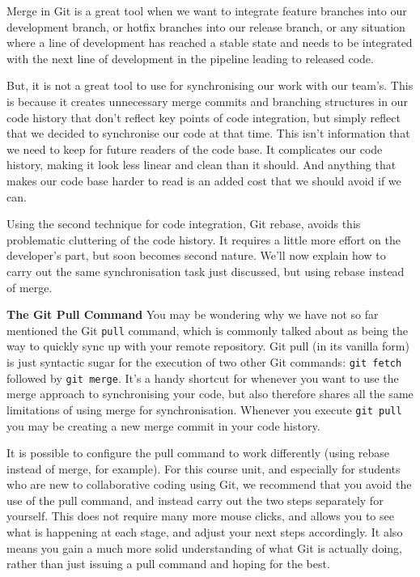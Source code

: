 \documentclass[
]{book}
\begin{document}
Merge in Git is a great tool when we want to integrate feature branches into our development branch, or hotfix branches into our release branch, or any situation where a line of development has reached a stable state and needs to be integrated with the next line of development in the pipeline leading to released code.

But, it is not a great tool to use for synchronising our work with our team's. This is because it creates unnecessary merge commits and branching structures in our code history that don't reflect key points of code integration, but simply reflect that we decided to synchronise our code at that time. This isn't information that we need to keep for future readers of the code base. It complicates our code history, making it look less linear and clean than it should. And anything that makes our code base harder to read is an added cost that we should avoid if we can.

Using the second technique for code integration, Git rebase, avoids this problematic cluttering of the code history. It requires a little more effort on the developer's part, but soon becomes second nature. We'll now explain how to carry out the same synchronisation task just discussed, but using rebase instead of merge.

\textbf{The Git Pull Command}
You may be wondering why we have not so far mentioned the Git \texttt{pull} command, which is commonly talked about as being the way to quickly sync up with your remote repository.
Git pull (in its vanilla form) is just syntactic sugar for the execution of two other Git commands: \texttt{git\ fetch} followed by \texttt{git\ merge}. It's a handy shortcut for whenever you want to use the merge approach to synchronising your code, but also therefore shares all the same limitations of using merge for synchronisation. Whenever you execute \texttt{git\ pull} you may be creating a new merge commit in your code history.

It is possible to configure the pull command to work differently (using rebase instead of merge, for example). For this course unit, and especially for students who are new to collaborative coding using Git, we recommend that you avoid the use of the pull command, and instead carry out the two steps separately for yourself. This does not require many more mouse clicks, and allows you to see what is happening at each stage, and adjust your next steps accordingly. It also means you gain a much more solid understanding of what Git is actually doing, rather than just issuing a pull command and hoping for the best.
\end{document}
